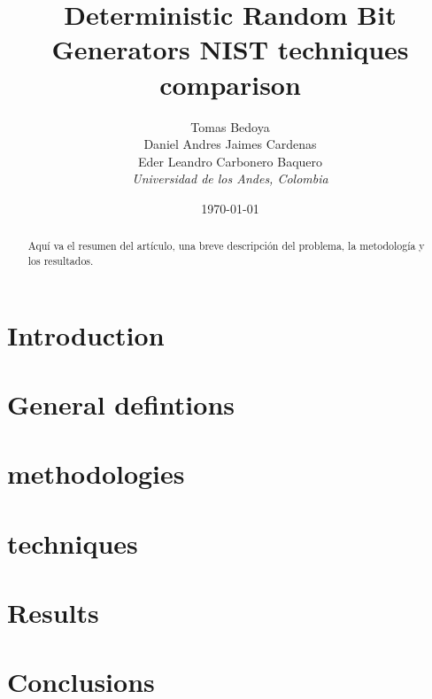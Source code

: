 \documentclass[conference]{IEEEtran}
\title{Deterministic Random Bit Generators NIST techniques comparison}
\author{
    Tomas Bedoya \\
    Daniel Andres Jaimes Cardenas \\
    Eder Leandro Carbonero Baquero \\
    \textit{Universidad de los Andes, Colombia}
}
\date{\today}
\begin{document}
\maketitle
\begin{abstract}
Aquí va el resumen del artículo, una breve descripción del problema, la metodología y los resultados.
\end{abstract}

\section{Introduction}


\section{General defintions}


\section{methodologies}


\section{techniques}


\section{Results}


\section{Conclusions}




\end{document}
